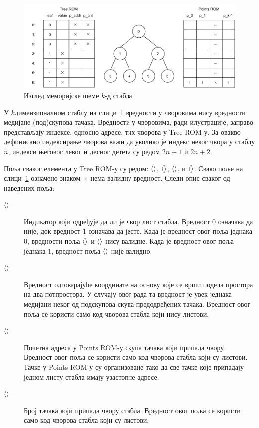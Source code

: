 \documentclass[master]{finthesis}
\newcommand*{\kdim}[1]{\texorpdfstring{$k$\Hyphdash}{k-}димензионал#1}
\newcommand*{\kd}{\texorpdfstring{$k$}{k}-д }
\newcommand*{\correctmath}[1]{%
    \ifcsname mathCorrectionFor#1\endcsname%
        \csname mathCorrectionFor#1\endcsname%
    \else%
        #1%
    \fi%
}
\newcommand*{\mfield}[1]{{\langle\correctmath{#1}\/\rangle}}
\newcommand*{\field}[1]{\texorpdfstring{$\mfield{#1}$}{⟨#1⟩}}
\begin{document}
\begin{figure}[h]
    \includegraphics[width=\linewidth]{slike/kd_roms}
    \caption{Изглед меморијске шеме \kd стабла.}
    \label{fig:kdroms}
\end{figure}


У \kdim{ном} стаблу на слици~\ref{fig:kdroms} вредности у чворовима нису вредности медијане (под)скупова тачака. Вредности у чворовима, ради илустрације, заправо представљају индексе, односно адресе, тих чворова у Tree ROM-у. За овакво дефинисано индексирање чворова важи да уколико је индекс неког чвора у стаблу $n$, индекси његовог левог и десног детета су редом $2n + 1$ и $2n + 2$.

Поља сваког елемента у Tree ROM-у су редом: \field{leaf}, \field{value}, \field{p_addr}, и \field{p_cnt}. Свако поље на слици~\ref{fig:kdroms} означено знаком $\times$ нема валидну вредност. Следи опис сваког од наведених поља:
\begin{description}
    \item[\field{leaf}] Индикатор који одређује да ли је чвор лист стабла. Вредност $0$ означава да није, док вредност $1$ означава да јесте. Када је вредност овог поља једнака $0$, вредности поља \field{p_addr} и \field{p_cnt} нису валидне. Када је вредност овог поља једнака $1$, вредност поља \field{value} није валидно.
    
    \item[\field{value}] Вредност одговарајуће координате на основу које се врши подела простора на два потпростора. У случају овог рада та вредност је увек једнака медијани неког од подскупова скупа предодређених тачака. Вредност овог поља се користи само код чворова стабла који нису листови.

    \item[\field{p_addr}] Почетна адреса у Points ROM-у скупа тачака који припада чвору. Вредност овог поља се користи само код чворова стабла који су листови. Тачке у Points ROM-у су организоване тако да све тачке које припадају једном листу стабла имају узастопне адресе.

    \item[\field{p_cnt}] Број тачака који припада чвору стабла. Вредност овог поља се користи само код чворова стабла који су листови.
\end{description}
\end{document}
